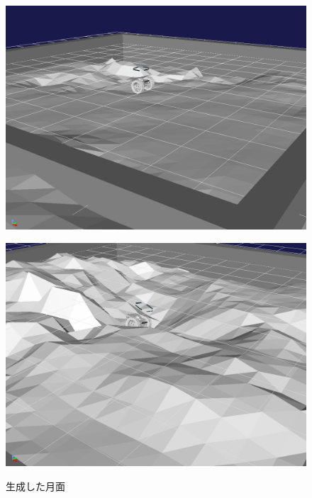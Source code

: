 \documentclass[uplatex,twocolumn, dvipdfmx]{jsarticle}  %
\begin{document}
\begin{figure}[t]
  \centering
  \begin{minipage}[b]{0.49\linewidth}
    \centering
    \includegraphics[keepaspectratio, scale=0.096]{images/generate_field3.png}
    \label{fig:generate_field3}
  \end{minipage}
  \begin{minipage}[b]{0.49\linewidth}
    \centering
    \includegraphics[keepaspectratio, scale=0.096]{images/generate_field4.png}
    \label{fig:generate_field4}
  \end{minipage}
  \caption{生成した月面}
\end{figure}
\end{document}
